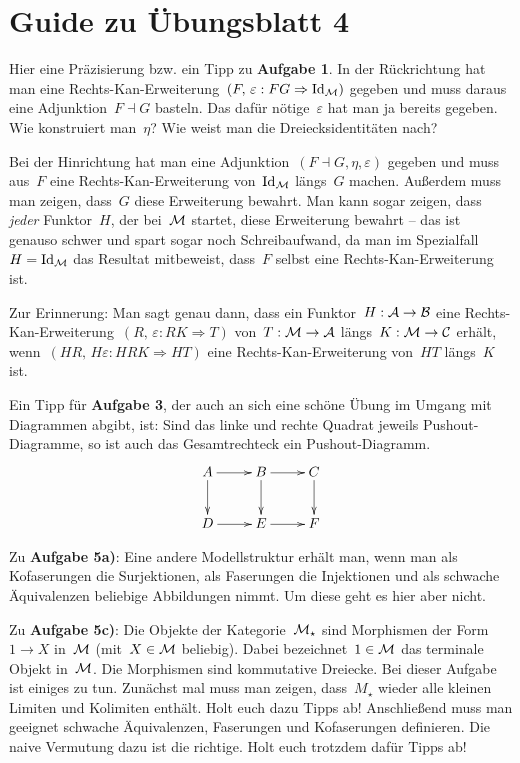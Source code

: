 \documentclass{uebblatt}
\begin{document}
\section*{Guide zu Übungsblatt 4}

Hier eine Präzisierung bzw. ein Tipp zu \textbf{Aufgabe 1}. In der Rückrichtung
hat man eine Rechts-Kan-Erweiterung~$(F,\,\varepsilon : F G \Rightarrow \mathrm{Id}_{\mathcal{M}})$
gegeben und muss daraus eine Adjunktion~$F \dashv G$ basteln. Das dafür
nötige~$\varepsilon$ hat man ja bereits gegeben. Wie konstruiert man~$\eta$?
Wie weist man die Dreiecksidentitäten nach?

Bei der Hinrichtung hat man eine Adjunktion~$(F \dashv G, \eta, \varepsilon)$
gegeben und muss aus~$F$ eine Rechts-Kan-Erweiterung von~$\mathrm{Id}_{\mathcal{M}}$ längs~$G$
machen. Außerdem muss man zeigen, dass~$G$ diese Erweiterung bewahrt. Man kann
sogar zeigen, dass \emph{jeder} Funktor~$H$, der bei~$\mathcal{M}$ startet, diese
Erweiterung bewahrt -- das ist genauso schwer und spart sogar noch
Schreibaufwand, da man im Spezialfall~$H = \mathrm{Id}_{\mathcal{M}}$ das Resultat mitbeweist,
dass~$F$ selbst eine Rechts-Kan-Erweiterung ist.

Zur Erinnerung: Man sagt genau dann, dass ein Funktor~$H : \mathcal{A} \to \mathcal{B}$ eine
Rechts-Kan-Erweiterung~$(R,\,\varepsilon : RK \Rightarrow T)$ von~$T : \mathcal{M} \to
\mathcal{A}$ längs~$K : \mathcal{M} \to \mathcal{C}$ erhält, wenn~$(HR,\,H\varepsilon : HRK \Rightarrow
HT)$ eine Rechts-Kan-Erweiterung von~$HT$ längs~$K$ ist.

Ein Tipp für \textbf{Aufgabe 3}, der auch an sich eine schöne Übung im Umgang
mit Diagrammen abgibt, ist: Sind das linke und rechte Quadrat jeweils
Pushout-Diagramme, so ist auch das Gesamtrechteck ein Pushout-Diagramm.
\[ \xymatrix{
  A \ar[r]\ar[d] & B \ar[r]\ar[d] & C \ar[d] \\
  D \ar[r] & E \ar[r] & F
} \]

Zu \textbf{Aufgabe 5a)}: Eine andere Modellstruktur erhält man, wenn man als
Kofaserungen die Surjektionen, als Faserungen die Injektionen und als schwache
Äquivalenzen beliebige Abbildungen nimmt. Um diese geht es hier aber nicht.

Zu \textbf{Aufgabe 5c)}: Die Objekte der Kategorie~$\mathcal{M}_\star$ sind Morphismen der
Form~$1 \to X$ in~$\mathcal{M}$ (mit~$X \in \mathcal{M}$ beliebig). Dabei bezeichnet~$1 \in \mathcal{M}$
das terminale Objekt in~$\mathcal{M}$. Die Morphismen sind kommutative Dreiecke.
Bei dieser Aufgabe ist einiges zu tun. Zunächst mal muss man zeigen,
dass~$M_\star$ wieder alle kleinen Limiten und Kolimiten enthält. Holt euch
dazu Tipps ab! Anschließend muss man geeignet schwache Äquivalenzen, Faserungen
und Kofaserungen definieren. Die naive Vermutung dazu ist die richtige. Holt
euch trotzdem dafür Tipps ab!
\end{document}
